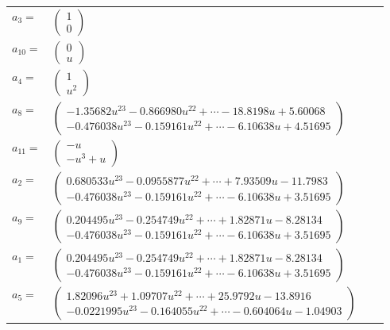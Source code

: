 \documentclass[1p]{elsarticle_modified}
\theoremstyle{definition}
\begin{document}
\begin{tabular}{m{7pt} m{180pt} m{7pt} m{180pt} }
\flushright $a_{3}=$&$\begin{pmatrix}1\\0\end{pmatrix}$ \\
\flushright $a_{10}=$&$\begin{pmatrix}0\\u\end{pmatrix}$ \\
\flushright $a_{4}=$&$\begin{pmatrix}1\\u^2\end{pmatrix}$ \\
\flushright $a_{8}=$&$\begin{pmatrix}-1.35682 u^{23}-0.866980 u^{22}+\cdots-18.8198 u+5.60068\\-0.476038 u^{23}-0.159161 u^{22}+\cdots-6.10638 u+4.51695\end{pmatrix}$ \\
\flushright $a_{11}=$&$\begin{pmatrix}- u\\- u^3+u\end{pmatrix}$ \\
\flushright $a_{2}=$&$\begin{pmatrix}0.680533 u^{23}-0.0955877 u^{22}+\cdots+7.93509 u-11.7983\\-0.476038 u^{23}-0.159161 u^{22}+\cdots-6.10638 u+3.51695\end{pmatrix}$ \\
\flushright $a_{9}=$&$\begin{pmatrix}0.204495 u^{23}-0.254749 u^{22}+\cdots+1.82871 u-8.28134\\-0.476038 u^{23}-0.159161 u^{22}+\cdots-6.10638 u+3.51695\end{pmatrix}$ \\
\flushright $a_{1}=$&$\begin{pmatrix}0.204495 u^{23}-0.254749 u^{22}+\cdots+1.82871 u-8.28134\\-0.476038 u^{23}-0.159161 u^{22}+\cdots-6.10638 u+3.51695\end{pmatrix}$ \\
\flushright $a_{5}=$&$\begin{pmatrix}1.82096 u^{23}+1.09707 u^{22}+\cdots+25.9792 u-13.8916\\-0.0221995 u^{23}-0.164055 u^{22}+\cdots-0.604064 u-1.04903\end{pmatrix}$ \\

\end{tabular}
\end{document}
